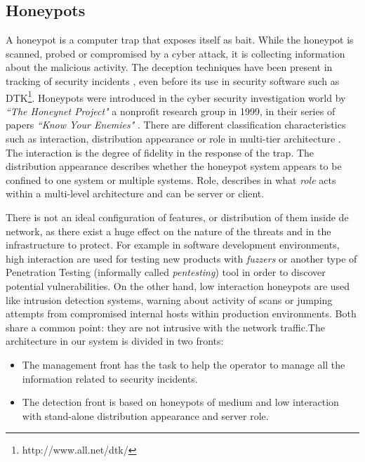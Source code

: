 \documentclass[a4paper]{llncs}
\begin{document}
\subsection{Honeypots}
A honeypot is a computer trap that exposes itself as bait. While the honeypot is scanned, probed or compromised by a cyber attack, it is collecting information about the malicious activity. The deception techniques have been present in tracking of security incidents \cite{Cheswick92anevening,RoleOfDeception}, even before its use in security software such as DTK\footnote{http://www.all.net/dtk/}. Honeypots were introduced in the cyber security investigation world by {\it``The Honeynet Project"} a nonprofit research group in 1999, in their series of papers {\it``Know Your Enemies"} \cite{KnowYourEnemies}. There are different classification characteristics such as interaction, distribution appearance or role in multi-tier architecture \cite{Seifert06taxonomyof}. The interaction is the degree of fidelity in the response of the trap. The distribution appearance describes whether the honeypot system appears to be confined to one system or multiple systems. Role, describes in what {\it role} acts within a multi-level architecture and can be server or client.

There is not an ideal configuration of features, or distribution of them inside de network, as there exist a huge effect on the nature of the threats and in the infrastructure to protect. For example in software development environments, high interaction are used for testing new products with {\it fuzzers} or another type of Penetration Testing (informally called {\it pentesting}) tool \cite{fuzzingforsec} in order to discover potential vulnerabilities. On the other hand, low interaction honeypots are used like intrusion detection systems, warning about activity of scans or jumping attempts from compromised internal hosts within production environments. Both share a common point: they are not intrusive with the network traffic.The architecture in our system is divided in two fronts:
\begin{itemize}
	\item The management front has the task to help the operator to manage all the information related to security incidents.
	\item The detection front is based on honeypots of medium and low interaction with stand-alone distribution appearance and server role.
\end{itemize}
\end{document}

